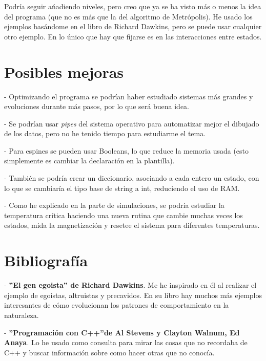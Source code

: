 \documentclass[a4paper,10pt,twocolumn]{article}
\begin{document}
Podr\'ia seguir a\'nadiendo niveles, pero creo que ya se ha visto m\'as o menos la idea del programa (que no es m\'as que la del algoritmo de Metr\'opolis). He usado los ejemplos bas\'andome en el libro de Richard Dawkins, pero se puede usar cualquier otro ejemplo. En lo \'unico que hay que fijarse es en las interacciones entre estados. 


\section*{Posibles mejoras}

- Optimizando el programa se podr\'ian haber estudiado sistemas m\'as grandes y evoluciones durante m\'as pasos, por lo que ser\'a buena idea. 

- Se podr\'ian usar \textit{pipes} del sistema operativo para automatizar mejor el dibujado de los datos, pero no he tenido tiempo para estudiarme el tema.

- Para espines se pueden usar Booleans, lo que reduce la memoria usada (esto simplemente es cambiar la declaraci\'on en la plantilla).

- Tambi\'en se podr\'ia crear un diccionario, asociando a cada entero un estado, con lo que se cambiar\'ia el tipo base de string a int, reduciendo el uso de RAM.

- Como he explicado en la parte de simulaciones, se podr\'ia estudiar la temperatura cr\'itica haciendo una nueva rutina que cambie muchas veces los estados, mida la magnetizaci\'on y resetee el sistema para diferentes temperaturas.


\section*{Bibliograf\'ia}
- \textbf{''El gen egoista'' de Richard Dawkins}. Me he inspirado en \'el al realizar el ejemplo de egoistas, altruistas y precavidos. En su libro hay muchos m\'as ejemplos interesantes de c\'omo evolucionan los patrones de comportamiento en la naturaleza.

- \textbf{''Programaci\'on con C++''de  Al Stevens y Clayton Walnum, Ed Anaya}. Lo he usado como consulta para mirar las cosas que no recordaba de C++ y buscar informaci\'on sobre como hacer otras que no conoc\'ia.
\end{document}
